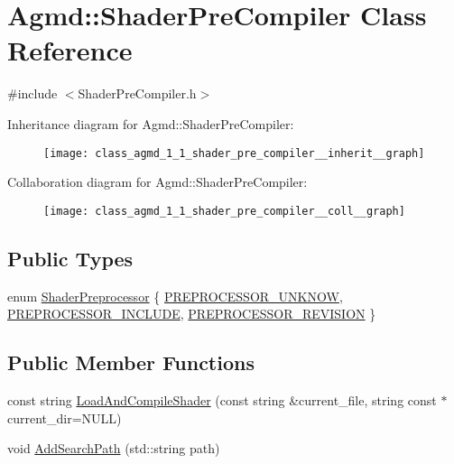 \hypertarget{class_agmd_1_1_shader_pre_compiler}{\section{Agmd\+:\+:Shader\+Pre\+Compiler Class Reference}
\label{class_agmd_1_1_shader_pre_compiler}
}


{\ttfamily \#include $<$Shader\+Pre\+Compiler.\+h$>$}



Inheritance diagram for Agmd\+:\+:Shader\+Pre\+Compiler\+:\nopagebreak
\begin{figure}[H]
\begin{center}
\leavevmode
\texttt{[image: class\_agmd\_1\_1\_shader\_pre\_compiler\_\_inherit\_\_graph]}
\end{center}
\end{figure}


Collaboration diagram for Agmd\+:\+:Shader\+Pre\+Compiler\+:\nopagebreak
\begin{figure}[H]
\begin{center}
\leavevmode
\texttt{[image: class\_agmd\_1\_1\_shader\_pre\_compiler\_\_coll\_\_graph]}
\end{center}
\end{figure}
\subsection*{Public Types}
\begin{DoxyCompactItemize}
\item 
enum \hyperlink{class_agmd_1_1_shader_pre_compiler_aa972735de2129e4ea164dbb29d8ce83f}{Shader\+Preprocessor} \{ \hyperlink{class_agmd_1_1_shader_pre_compiler_aa972735de2129e4ea164dbb29d8ce83fab5dcfdc2401dfbd525c902480b57acda}{P\+R\+E\+P\+R\+O\+C\+E\+S\+S\+O\+R\+\_\+\+U\+N\+K\+N\+O\+W}, 
\hyperlink{class_agmd_1_1_shader_pre_compiler_aa972735de2129e4ea164dbb29d8ce83fa18d8e65d5c63780db20407171ba8a186}{P\+R\+E\+P\+R\+O\+C\+E\+S\+S\+O\+R\+\_\+\+I\+N\+C\+L\+U\+D\+E}, 
\hyperlink{class_agmd_1_1_shader_pre_compiler_aa972735de2129e4ea164dbb29d8ce83faab7fc29129348d51ad1bd64e8250499a}{P\+R\+E\+P\+R\+O\+C\+E\+S\+S\+O\+R\+\_\+\+R\+E\+V\+I\+S\+I\+O\+N}
 \}
\end{DoxyCompactItemize}
\subsection*{Public Member Functions}
\begin{DoxyCompactItemize}
\item 
const string \hyperlink{class_agmd_1_1_shader_pre_compiler_a1b4b729ae9c7aa921d0871d40baaad68}{Load\+And\+Compile\+Shader} (const string \&current\+\_\+file, string const $\ast$current\+\_\+dir=N\+U\+L\+L)
\item 
void \hyperlink{class_agmd_1_1_shader_pre_compiler_adaf0f7c1f7c232cb4f10fd3290ff63be}{Add\+Search\+Path} (std\+::string path)
\end{DoxyCompactItemize}
